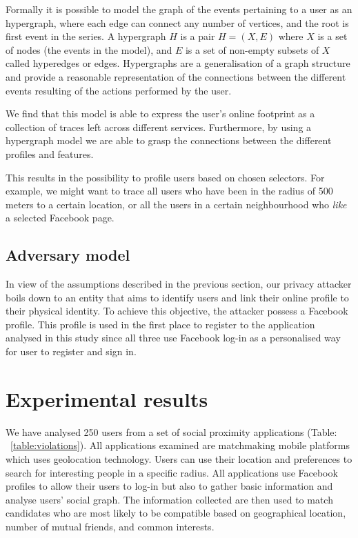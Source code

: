 Formally it is possible to model the graph of the events pertaining to a user as an hypergraph, where each edge can connect any number of vertices, and the root is first event in the series.  A hypergraph $H$ is a pair $H = (X,E)$ where $X$ is a set of nodes (the events in the model), and $E$ is a set of non-­empty subsets of $X$ called hyperedges or edges. Hypergraphs are a generalisation of a graph structure and provide a reasonable representation of the connections between the different events resulting of the actions performed by the user.

We find that this model is able to express the user's online footprint as a collection of traces left across different services. Furthermore, by using a hypergraph model we are able to grasp the connections between the different profiles and features.

This results in the possibility to profile users based on chosen selectors. For example, we might want to trace all users who have been in the radius of 500 meters to a certain location, or all the users in a certain neighbourhood who \emph{like} a selected Facebook page.

\subsection{Adversary model}

In view of the assumptions described in the previous section, our privacy attacker boils down to an entity that aims to identify users and link their online profile to their physical identity. To achieve this objective, the attacker possess a Facebook profile. This profile is used in the first place to register to the application analysed in this study since all three use Facebook log-in as a personalised way for user to register and sign in.

\section{Experimental results}
\label{sec:exp-results}
\noindent
We have analysed 250 users from a set of social proximity applications (Table: ~\ref{table:violations}). All applications examined are matchmaking mobile platforms which uses geolocation technology. Users can use their location and preferences to search for interesting people in a specific radius. All applications use Facebook profiles to allow their users to log-in but also to gather basic information and analyse users' social graph. The information collected are then used to match candidates who are most likely to be compatible based on geographical location, number of mutual friends, and common interests.

